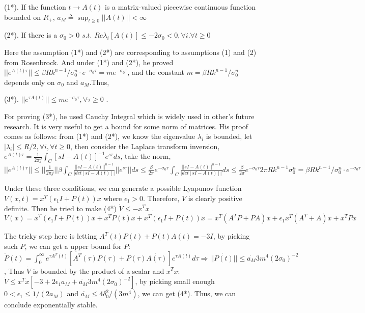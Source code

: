 \documentclass{article}
\begin{document}
(1*). If the function $t \rightarrow A(t)$ is a matrix-valued piecewise continuous function bounded on $R_{+}$, $a_M \triangleq \sup_{t \ge 0} ||A(t)|| < \infty$ 

(2*). If there is a $\sigma_0 > 0$ $s.t.$ $Re \lambda_i[A(t)] \leq -2 \sigma_0 < 0, \forall i. \forall t \ge 0$ 

Here the assumption (1*) and (2*) are corresponding to assumptions (1) and (2) from Rosenbrock. And under (1*) and (2*), he proved $||e^{A(t) \tau}|| \leq \beta R k^{n-1} / \sigma_0^n \cdot e^{-\sigma_0 \tau} = m e^{-\sigma_0 \tau}$, and the constant $m = \beta R k^{n-1} / \sigma_0^n$ depends only on $\sigma_0$ and $a_M$.Thus,

(3*). $||e^{\tau A(t)}|| \leq m e^{-\sigma_0 \tau}, \forall \tau \ge 0$ .

For proving (3*), he used Cauchy Integral which is widely used in other's future research. It is very useful to get a bound for some norm of matrices. His proof comes as follows: from (1*) and (2*), we know the eigenvalue $\lambda_i$ is bounded, let $|\lambda_i| \leq R/2, \forall i, \forall t \ge 0$, then consider the Laplace transform inversion, $e^{A(t) \tau} = \frac{1}{2 \pi j} \int_C [s I - A(t)]^{-1} e^{s \tau} ds$, take the norm, $||e^{A(t) \tau}|| \leq ||\frac{1}{2 \pi j}|| \beta \int_C \frac{||s I - A(t)||^{n-1}}{|det[s I - A(t)]|} ||e^{s \tau}|| ds \leq \frac{\beta}{2 \pi} e^{-\sigma_0 \tau} \int_C \frac{||s I - A(t)||^{n-1}}{|det[s I - A(t)]|} ds \leq \frac{\beta}{2 \pi} e^{-\sigma_0 \tau} 2 \pi R k^{n-1} \sigma_0^n = \beta R k^{n-1} / \sigma_0^n \cdot e^{-\sigma_0 \tau}$

Under these three conditions, we can generate a possible Lyapunov function $V(x,t) = x^T (\epsilon_1 I + P(t)) x$ where $\epsilon_1 > 0$. Therefore, $V$ is clearly positive definite. Then he tried to make (4*) $\dot{V} \leq -x^T x$ .
$$\dot{V}(x) = \dot{x}^T (\epsilon_1 I + P(t))x + x^T \dot{P}(t) x + x^T (\epsilon_1 I + P(t)) \dot{x} = x^T(A^T P + PA)x + \epsilon_1 x^T (A^T + A) x + x^T \dot{P} x$$

The tricky step here is letting $A^T(t) P(t) + P(t) A(t) = -3 I$, by picking such $P$, we can get a upper bound for $\dot{P}$: $\dot{P}(t) = \int_0^{\infty} e^{\tau A^T(t)} [\dot{A^T}(\tau)P(\tau) + P(\tau) \dot{A(\tau)}]e^{\tau A(t)}d\tau \Longrightarrow ||\dot{P(t)}|| \leq \dot{a_M} 3 m^4 (2\sigma_0)^{-2}$, Thus $\dot{V}$ is bounded by the product of a scalar and $x^T x$: $\dot{V} \leq x^T x [-3 + 2\epsilon_1 a_M + \dot{a_M} 3 m^4 (2\sigma_0)^{-2}]$, by picking small enough $0 < \epsilon_1 \leq 1/(2 a_M)$ and $\dot{a_M} \leq 4 \delta_0^2 /(3 m^4)$, we can get (4*). Thus, we can conclude exponentially stable.
\end{document}
